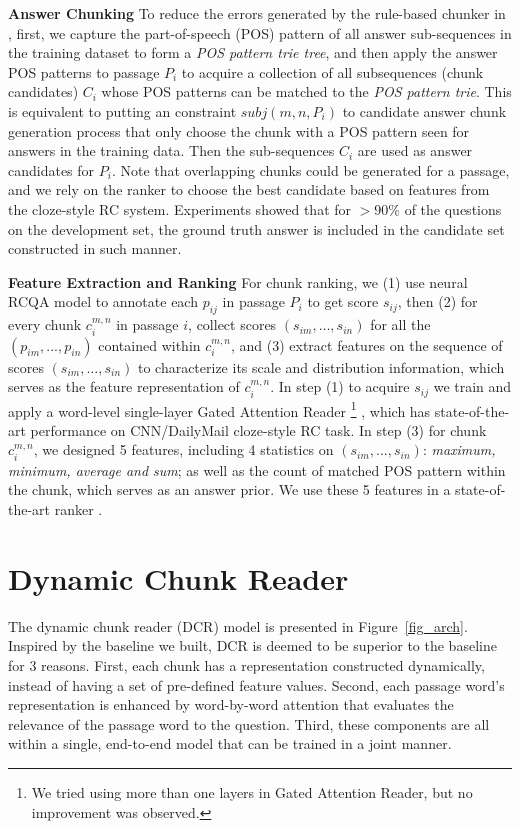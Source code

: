 \documentclass[letterpaper]{article}
\newcommand{\dcr}{DCR}
\begin{document}
\noindent\textbf{Answer Chunking}
To reduce the errors generated by the rule-based chunker in \cite{rajpurkar2016squad}, first, we capture the part-of-speech (POS) pattern of all answer sub-sequences in the training dataset to form a \textit{POS pattern trie tree}, and then apply the answer POS patterns to passage $P_i$ to acquire a collection of all subsequences (chunk candidates) $C_i$ whose POS patterns can be matched to the \textit{POS pattern trie}. This is equivalent to putting an constraint $subj(m,n,P_i)$ to candidate answer chunk generation process that only choose the chunk with a POS pattern seen for answers in the training data. Then the sub-sequences $C_i$ are used as answer candidates for $P_i$. Note that overlapping chunks could be generated for a passage, and we rely on the ranker to choose the best candidate based on features from the cloze-style RC system. Experiments showed that for $>90\%$ of the questions on the development set, the ground truth answer is included in the candidate set constructed in such manner.

\noindent\textbf{Feature Extraction and Ranking} 
For chunk ranking, we (1) use neural RCQA model to annotate each $p_{ij}$ in passage $P_i$ to get score $s_{ij}$, then (2) for every chunk $c_{i}^{m,n}$ in passage $i$, collect scores $(s_{im},\dots, s_{in})$ for all the $(p_{im}, ..., p_{in})$ contained within $c_{i}^{m,n}$, and (3) extract features on the sequence of scores $(s_{im},\dots, s_{in})$ to characterize its scale and distribution information, which serves as the feature representation of $c_{i}^{m,n}$. In step (1) to acquire $s_{ij}$ we train and apply a word-level single-layer Gated Attention Reader \footnote{We tried using more than one layers in Gated Attention Reader, but no improvement was observed.} \cite{dhingra2016gated}, which has state-of-the-art performance on CNN/DailyMail cloze-style RC task. In step (3) for chunk $c_{i}^{m,n}$, we designed 5 features, including 4 statistics on $(s_{im},\dots, s_{in})$: \textit{maximum, minimum, average and sum}; as well as the count of matched POS pattern within the chunk, which serves as an answer prior. We use these 5 features in a state-of-the-art ranker \cite{Ganji:2011:SIGIR}.

\section{Dynamic Chunk Reader}
\label{sect_dcr}
The dynamic chunk reader (\dcr) model is presented in Figure~\ref{fig_arch}. Inspired by the baseline we built, DCR is deemed to be superior to the baseline for 3 reasons. First, each chunk has a representation constructed dynamically, instead of having a set of pre-defined feature values. Second, each passage word's representation is enhanced by word-by-word attention that evaluates the relevance of the passage word to the question. Third, these components are all within a single, end-to-end model that can be trained in a joint manner.
\end{document}
